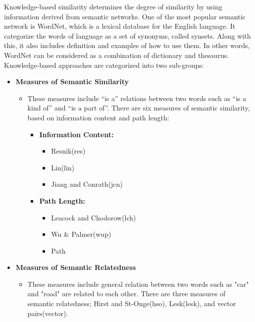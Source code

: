 \documentclass{article}
\begin{document}
Knowledge-based similarity determines the degree of  similarity by using information derived from semantic networks. One of the most popular semantic network is WordNet, which is a lexical database for the English language. It categorize the words of language as a set of synonyms, called synsets. Along with this, it also includes definition and examples of how to use them. In other words, WordNet can be considered as a combination of dictionary and thesaurus\cite{wordNet}. Knowledge-based approaches are categorized into two sub-groups: 
\begin{itemize}
\item \textbf{Measures of Semantic Similarity}
	\begin{itemize}
	\item These measures include ``is a'' relations between two words such as ``is a kind of'' and ``is a part of''.  There are six measures of semantic similarity, based on information content and path length\cite{survey}:
	\begin{itemize}
	\item \textbf{Information Content:}
	
	\begin{itemize}
			
	\item Resnik(res)
	\item Lin(lin)
	\item Jiang and Conrath(jcn)
	
	\end{itemize}
	\end{itemize}
	\begin{itemize}
	\item \textbf{Path Length:}
	\begin{itemize}
	
	
	\item Leacock and Chodorow(lch)
	\item Wu \& Palmer(wup)
	\item Path
	\end{itemize}
\end{itemize} 
	\end{itemize}
\end{itemize}

\begin{itemize}
\item \textbf{Measures of Semantic Relatedness}
	\begin{itemize}
	\item These measures include general relation between two words such as "car" and "road" are related to each other. There are three measures of semantic relatedness; Hirst and St-Onge(hso), Lesk(lesk), and vector pairs(vector)\cite{survey}.
	\end{itemize}
\end{itemize}
\end{document}
